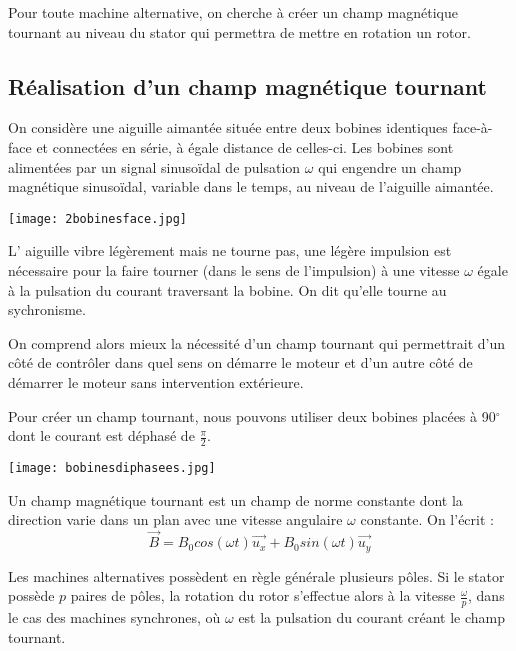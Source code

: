 \documentclass[12pt,prb,aps,epsf]{article}
\begin{document}

Pour toute machine alternative, on cherche à créer un champ magnétique tournant au niveau du stator qui permettra de mettre en rotation un rotor. 

\subsection{Réalisation d'un champ magnétique tournant}
On considère une aiguille aimantée située entre deux bobines identiques face-à-face et connectées en série, à égale distance de celles-ci. Les bobines sont alimentées par un signal sinusoïdal de pulsation $\omega$ qui engendre un champ magnétique sinusoïdal, variable dans le temps, au niveau de l'aiguille aimantée. 


\begin{center}
    \texttt{[image: 2bobinesface.jpg]}
\end{center}


L' aiguille vibre légèrement mais ne tourne pas, une légère impulsion est nécessaire pour la faire tourner (dans le sens de l'impulsion) à une vitesse $\omega$ égale à la pulsation du courant traversant la bobine. On dit qu'elle tourne au sychronisme. 

On comprend alors mieux la nécessité d'un champ tournant qui permettrait d'un côté de contrôler dans quel sens on démarre le moteur et d'un autre côté de démarrer le moteur sans intervention extérieure. 

\medskip

Pour créer un champ tournant, nous pouvons utiliser deux bobines placées à 90$^\circ$ dont le courant est déphasé de $\frac{\pi}{2}$. 

\begin{center}
    \texttt{[image: bobinesdiphasees.jpg]}
\end{center}

Un champ magnétique tournant est un champ de norme constante dont la direction varie dans un plan avec une vitesse angulaire $\omega$ constante. On l'écrit : 
\begin{equation}
    \vec{B} = B_0 cos(\omega t)\vec{u_x} + B_0 sin(\omega t)\vec{u_y}
\end{equation}

Les machines alternatives possèdent en règle générale plusieurs pôles. Si le stator possède $p$ paires de pôles, la rotation du rotor s'effectue alors à la vitesse $\frac{\omega}{p}$, dans le cas des machines synchrones, où $\omega$ est la pulsation du courant créant le champ tournant.
\end{document}
